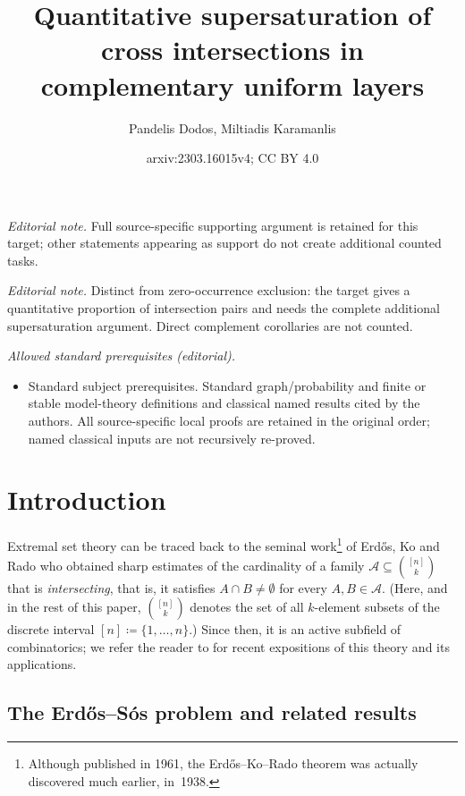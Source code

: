 \documentclass[10pt,a4paper]{amsart}
\title{Quantitative supersaturation of cross intersections in complementary uniform layers}
\author{Pandelis Dodos, Miltiadis Karamanlis}
\date{arxiv:2303.16015v4; CC BY 4.0}
\theoremstyle{remark}
\begin{document}
\maketitle
\noindent\textit{Editorial note.} Full source-specific supporting argument is retained for this target; other statements appearing as support do not create additional counted tasks.\par\medskip
\noindent\textit{Editorial note.} Distinct from zero-occurrence exclusion: the target gives a quantitative proportion of intersection pairs and needs the complete additional supersaturation argument. Direct complement corollaries are not counted.\par\medskip
\noindent\textit{Allowed standard prerequisites (editorial).}\begin{itemize}
\item Standard subject prerequisites. Standard graph/probability and finite or stable model-theory definitions and classical named results cited by the authors. All source-specific local proofs are retained in the original order; named classical inputs are not recursively re-proved.
\end{itemize}\medskip
\section{Introduction} \label{sec1}


Extremal set theory can be traced back to the seminal work\footnote{Although published in 1961,
the Erd\H{o}s--Ko--Rado theorem was actually discovered much earlier, in~1938.} of Erd\H{o}s, Ko and
Rado \cite{EKR61} who obtained sharp estimates of the cardinality of a family $\mathcal{A}\subseteq \binom{[n]}{k}$
that is \textit{intersecting}, that is, it satisfies $A\cap B\neq \emptyset$ for every $A,B\in\mathcal{A}$.
(Here, and in the rest of this paper, $\binom{[n]}{k}$ denotes the set of all $k$-element subsets of
the discrete interval $[n]\coloneqq \{1,\dots,n\}$.) Since then, it is an active subfield of combinatorics;
we refer the reader to \cite{El22,FT18} for recent expositions of this theory and its applications.

\subsection{The Erd\H{o}s--S\'{o}s problem and related results} \label{subsec1.1}
\end{document}
